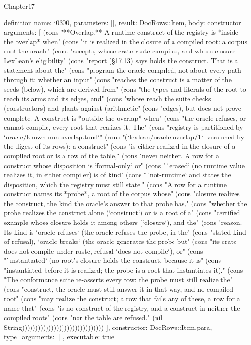 \begin{lexlean}{Chapter17}
\begin{semanticmodule}
definition{
  name: i0300,
  parameters: [],
  result: DocRows::Item,
  body: constructor{
    arguments: [
      (cons "**Overlap.** A runtime construct of the registry is *inside the overlap* when" (cons "it is realized in the closure of a compiled root: a corpus root the oracle" (cons "accepts, whose crate rustc compiles, and whose closure LexLean's eligibility" (cons "report (§17.13) says holds the construct. That is a statement about the" (cons "program the oracle compiled, not about every path through it: whether an input" (cons "reaches the construct is a matter of the seeds (below), which are derived from" (cons "the types and literals of the root to reach its arms and its edges, and" (cons "whose reach the suite checks (constructors) and plants against (arithmetic" (cons "edges), but does not prove complete. A construct is *outside the overlap* when" (cons "the oracle refuses, or cannot compile, every root that realizes it. The" (cons "registry is partitioned by `oracle/known-non-overlap.toml`" (cons "(`lexlean/oracle-overlap/1`, versioned by the digest of its rows): a construct" (cons "is either realized in the closure of a compiled root or is a row of the table," (cons "never neither. A row for a construct whose disposition is `formal-only` or" (cons "`erased` (no runtime value realizes it, in either compiler) is of kind" (cons "`not-runtime` and states the disposition, which the registry must still state." (cons "A row for a runtime construct names its *probe*, a root of the corpus whose" (cons "closure realizes the construct, the kind the oracle's answer to that probe has," (cons "whether the probe realizes the construct alone (`construct`) or is a root of a" (cons "certified example whose closure holds it among others (`closure`), and the" (cons "reason. Its kind is `oracle-refuses` (the oracle refuses the probe, in the" (cons "stated kind of refusal), `oracle-breaks` (the oracle generates the probe but" (cons "its crate does not compile under rustc, refusal `does-not-compile`), or" (cons "`instantiated` (no root's closure holds the construct, because it is" (cons "instantiated before it is realized; the probe is a root that instantiates it)." (cons "The conformance suite re-asserts every row: the probe must still realize the" (cons "construct, the oracle must still answer it in that way, and no compiled root" (cons "may realize the construct; a row that fails any of these, a row for a name that" (cons "is no construct of the registry, and a construct in neither the compiled roots" (cons "nor the table are refused." (nil String)))))))))))))))))))))))))))))))
    ],
    constructor: DocRows::Item.para,
    type_arguments: []
  },
  executable: true
}


\end{semanticmodule}
\end{lexlean}
